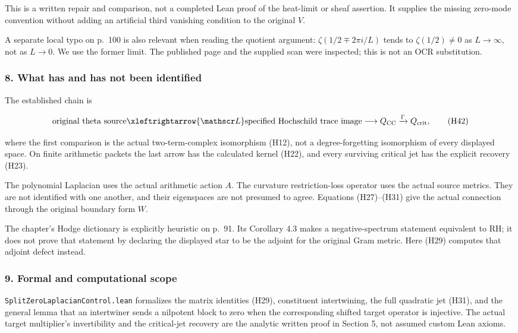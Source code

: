 This is a written repair and comparison, not a completed Lean proof of the heat-limit or sheaf assertion. It supplies the missing zero-mode convention without adding an artificial third vanishing condition to the original \(V\).

A separate local typo on p.~100 is also relevant when reading the quotient argument: \(\zeta(1/2\mp2\pi i/L)\) tends to \(\zeta(1/2)\ne0\) as \(L\to\infty\), not as \(L\to0\). We use the former limit. The published page and the supplied scan were inspected; this is not an OCR substitution.

\subsubsection{8. What has and has not been identified}\label{endpoint-cc_hochschild--what-has-and-has-not-been-identified}

The established chain is

\[
\text{original theta source}
\xleftrightarrow{\mathscr L}
\text{specified Hochschild trace image}
\longrightarrow Q_{\rm CC}
\xrightarrow{\Gamma}Q_{\rm crit},
\tag{H42}
\]

where the first comparison is the actual two-term-complex isomorphism (H12), not a degree-forgetting isomorphism of every displayed space. On finite arithmetic packets the last arrow has the calculated kernel (H22), and every surviving critical jet has the explicit recovery (H23).

The polynomial Laplacian uses the actual arithmetic action \(A\). The curvature restriction-loss operator uses the actual source metrics. They are not identified with one another, and their eigenspaces are not presumed to agree. Equations (H27)--(H31) give the actual connection through the original boundary form \(W\).

The chapter's Hodge dictionary is explicitly heuristic on p.~91. Its Corollary 4.3 makes a negative-spectrum statement equivalent to RH; it does not prove that statement by declaring the displayed star to be the adjoint for the original Gram metric. Here (H29) computes that adjoint defect instead.

\subsubsection{9. Formal and computational scope}\label{endpoint-cc_hochschild--formal-and-computational-scope}

\nolinkurl{SplitZeroLaplacianControl.lean} formalizes the matrix identities (H29), constituent intertwining, the full quadratic jet (H31), and the general lemma that an intertwiner sends a nilpotent block to zero when the corresponding shifted target operator is injective. The actual target multiplier's invertibility and the critical-jet recovery are the analytic written proof in Section 5, not assumed custom Lean axioms.

